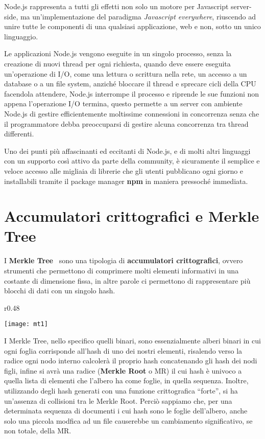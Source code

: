 Node.js rappresenta a tutti gli effetti non solo un motore per Javascript server-side,
ma un'implementazione del paradigma \emph{Javascript everywhere}, riuscendo ad unire
tutte le componenti di una qualsiasi applicazione, web e non, sotto un unico linguaggio.

Le applicazioni Node.js vengono eseguite in un singolo processo, senza la creazione di
nuovi thread per ogni richiesta, quando deve essere eseguita un'operazione di I/O,
come una lettura o scrittura nella rete, un accesso a un database o a un file system,
anziché bloccare il thread e sprecare cicli della CPU facendola attendere, Node.js
interrompe il processo e riprende le sue funzioni non appena l'operazione I/O termina,
questo permette a un server con ambiente Node.js di gestire efficientemente moltissime
connessioni in concorrenza senza che il programmatore debba preoccuparsi di gestire
alcuna concorrenza tra thread differenti.

Uno dei punti più affascinanti ed eccitanti di Node.js, e di molti altri linguaggi
con un supporto così attivo da parte della community, è sicuramente il semplice e
veloce accesso alle migliaia di librerie che gli utenti pubblicano ogni giorno e
installabili tramite il package manager \textbf{npm} in maniera pressoché immediata.

\newpage

\section{Accumulatori crittografici e Merkle Tree}
\label{sub:mt}
I \textbf{Merkle Tree}~\cite{mertree} sono una tipologia di \textbf{accumulatori crittografici}, ovvero strumenti che permettono
di comprimere molti elementi informativi in una costante di dimensione fissa, in altre parole
ci permettono di rappresentare più blocchi di dati con un singolo hash.
\begin{wrapfigure}{r}{0.48\textwidth}
    \vspace{-20pt}
    \begin{center}
      \texttt{[image: mt1]}
    \end{center}
    \vspace{-20pt}
\end{wrapfigure}
I Merkle Tree, nello specifico quelli binari, sono essenzialmente alberi binari
in cui ogni foglia corrisponde all'hash di uno dei nostri elementi, risalendo verso la radice ogni
nodo interno calcolerà il proprio hash concatenando gli hash dei nodi figli, infine si avrà
una radice (\textbf{Merkle Root} o MR) il cui hash è univoco a quella lista di elementi che l'albero
ha come foglie, in quella sequenza.
Inoltre, utilizzando degli hash generati con una funzione crittografica “forte”, si ha
un'assenza di collisioni tra le Merkle Root.
Perciò sappiamo che, per una determinata sequenza di documenti i cui hash sono le foglie dell'albero, anche solo una
piccola modfica ad un file causerebbe un cambiamento significativo, se non totale, della MR.


